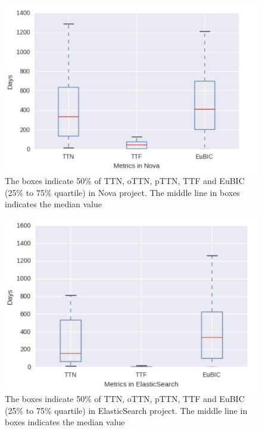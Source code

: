 \documentclass[10pt, conference]{IEEEtran}
\begin{document}
\begin{figure}[ht]
\centering
\includegraphics[width=\columnwidth]{boxplotNova.png}
\caption{The boxes indicate 50\% of TTN, oTTN, pTTN, TTF and EuBIC (25\% to 75\% quartile) in Nova project. The middle line in boxes indicates the median value}
\label{fig:meansOfNova}       %
\end{figure}

\begin{figure}[ht]
\centering
\includegraphics[width=\columnwidth]{boxplotES.png}
\caption{The boxes indicate 50\% of TTN, oTTN, pTTN, TTF and EuBIC (25\% to 75\% quartile) in ElasticSearch project. The middle line in boxes indicates the median value}
\label{fig:meansOfES}       %
\end{figure}
\end{document}
